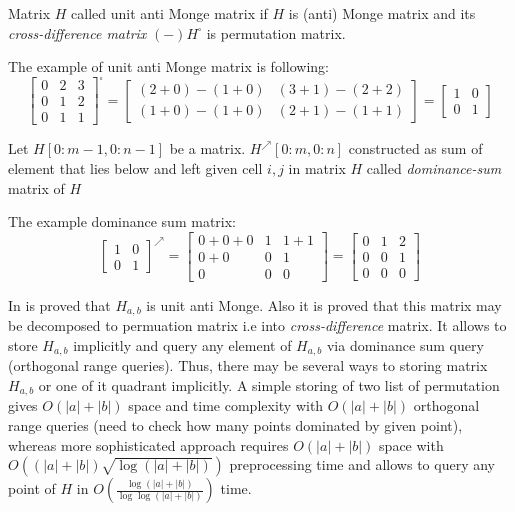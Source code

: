 \begin{definition}
Matrix $H$ called unit anti Monge matrix if $H$ is (anti) Monge matrix and its \emph{cross-difference matrix} $(-)H^{\square}$ is permutation matrix.
\end{definition}
The example of unit anti Monge matrix is following:
\begin{equation}
\begin{bmatrix}
0 & 2 & 3 \\
0 & 1 & 2 \\
0 & 1 & 1
\end{bmatrix} ^ { \square} =
\begin{bmatrix}
(2 + 0) - (1 + 0)  & (3 + 1) - (2 + 2)  \\
(1 + 0) - (1 + 0) &  (2 + 1) - (1 + 1) 
\end{bmatrix} = 
\begin{bmatrix}
1 & 0  \\
0 & 1 
\end{bmatrix} 
\end{equation}
 


\begin{definition}
Let $H[0:m-1,0:n-1]$  be a matrix.
$H^{\nearrow}[0:m,0:n]$ constructed as sum of element that lies below and left given cell $i,j$ in matrix $H$ called \emph{dominance-sum} matrix of $H$
\end{definition}

The example dominance sum matrix:
\begin{equation}
\begin{bmatrix}
1 & 0  \\
0 & 1 
\end{bmatrix}^{\nearrow} =
\begin{bmatrix}
0+0+0 & 1 & 1+1 \\
0+0 & 0 & 1 \\
0 & 0 & 0
\end{bmatrix} =
\begin{bmatrix}
0 & 1 & 2 \\
0 & 0 & 1 \\
0 & 0 & 0
\end{bmatrix}
\end{equation}

In \cite{tiskin} is proved that $H_{a,b}$ is unit anti Monge.
Also it is proved that  this matrix may be decomposed to permuation matrix i.e into \emph{cross-difference} matrix.
It allows to store $H_{a,b}$ implicitly and query any element of $H_{a,b}$ via dominance sum query (orthogonal range queries).
Thus, there may be several ways to storing matrix $H_{a,b}$ or one of it quadrant implicitly.
A simple storing of two list of permutation gives $O(|a|+|b|)$
space and time complexity with $O(|a|+|b|)$ orthogonal range queries (need to check  how many points dominated by given point), whereas more sophisticated approach requires
$O(|a|+|b|)$  space with $O( (|a|+|b|) \sqrt{\log{ (|a| +|b|)} } )$ preprocessing time and allows to query any point of $H$ in $O(\frac{\log (|a|+|b|)}{\log \log (|a|+|b|)})$ time.  

